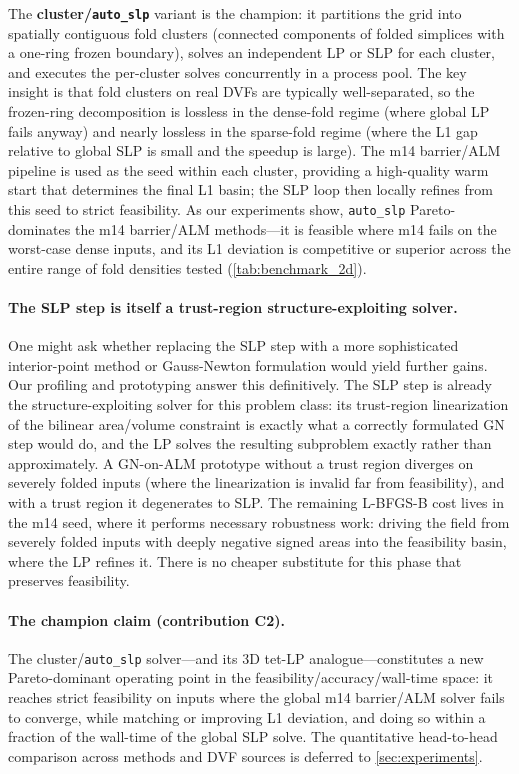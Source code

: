 The \textbf{cluster/\texttt{auto\_slp}} variant is the champion: it partitions the grid into spatially contiguous fold clusters (connected components of folded simplices with a one-ring frozen boundary), solves an independent LP or SLP for each cluster, and executes the per-cluster solves concurrently in a process pool. The key insight is that fold clusters on real DVFs are typically well-separated, so the frozen-ring decomposition is lossless in the dense-fold regime (where global LP fails anyway) and nearly lossless in the sparse-fold regime (where the L1 gap relative to global SLP is small and the speedup is large). The m14 barrier/ALM pipeline is used as the seed within each cluster, providing a high-quality warm start that determines the final L1 basin; the SLP loop then locally refines from this seed to strict feasibility. As our experiments show, \texttt{auto\_slp} Pareto-dominates the m14 barrier/ALM methods—it is feasible where m14 fails on the worst-case dense inputs, and its L1 deviation is competitive or superior across the entire range of fold densities tested (\autoref{tab:benchmark_2d}).

\paragraph{The SLP step is itself a trust-region structure-exploiting solver.}
One might ask whether replacing the SLP step with a more sophisticated interior-point method or Gauss-Newton formulation would yield further gains. Our profiling and prototyping answer this definitively. The SLP step is already the structure-exploiting solver for this problem class: its trust-region linearization of the bilinear area/volume constraint is exactly what a correctly formulated GN step would do, and the LP solves the resulting subproblem exactly rather than approximately. A GN-on-ALM prototype without a trust region diverges on severely folded inputs (where the linearization is invalid far from feasibility), and with a trust region it degenerates to SLP. The remaining L-BFGS-B cost lives in the m14 seed, where it performs necessary robustness work: driving the field from severely folded inputs with deeply negative signed areas into the feasibility basin, where the LP refines it. There is no cheaper substitute for this phase that preserves feasibility.

\paragraph{The champion claim (contribution C2).}
The cluster/\texttt{auto\_slp} solver—and its 3D tet-LP analogue—constitutes a new Pareto-dominant operating point in the feasibility/accuracy/wall-time space: it reaches strict feasibility on inputs where the global m14 barrier/ALM solver fails to converge, while matching or improving L1 deviation, and doing so within a fraction of the wall-time of the global SLP solve. The quantitative head-to-head comparison across methods and DVF sources is deferred to \autoref{sec:experiments}.

